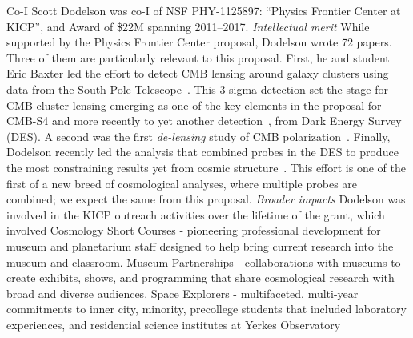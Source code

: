 Co-I Scott Dodelson was co-I of NSF PHY-1125897: ``Physics Frontier Center at KICP'', and Award of \$22M spanning 2011--2017.
{\it Intellectual merit}
While supported by the Physics Frontier Center proposal, Dodelson
wrote 72 papers. Three of them are particularly relevant to this
proposal. First, he and student Eric Baxter led the effort to detect
CMB lensing around galaxy clusters using data from the South Pole
Telescope~\cite{Baxter:2014frs}. This 3-sigma detection set the stage
for CMB cluster lensing emerging as one of the key elements in the
proposal for CMB-S4 and more recently to yet another detection~\cite{Baxter:2017ixz}, from Dark Energy
Survey (DES). 
A second was the first 
{\it  de-lensing} study of CMB
polarization~\cite{Manzotti:2017net}.
Finally, Dodelson recently led the analysis that combined probes in
the DES to produce the most constraining results
yet from cosmic structure~\cite{Abbott:2017wau}. This effort is one
of the first of a new breed of cosmological analyses, where multiple
probes are combined; we expect the same from this proposal.
{\it Broader impacts} Dodelson was involved in the KICP outreach
activities over the lifetime of the grant, which involved     
Cosmology Short Courses - pioneering professional development for museum 
and planetarium staff designed to help bring current research into the 
museum and classroom.
 Museum Partnerships - collaborations with museums to create 
exhibits, shows, and programming that share cosmological research with 
broad and diverse audiences.
 Space Explorers - multifaceted, multi-year commitments
to inner city, minority, precollege students that included
 laboratory experiences, 
and residential science institutes at Yerkes Observatory

